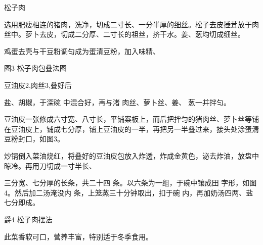\begin{recipe}{松子肉}

\ingredients


\cooking

\step 选用肥瘦相连的猪肉，洗净，切成二寸长、一分半厚的细丝。松子去皮捶茸放于肉丝中。萝卜去皮，切成二分厚、二寸长的祖丝，挤干水。姜、葱均切成细丝。

\step 鸡蛋去壳与干豆粉调匀成为蛋清豆粉，加入味精、

图3 松子肉包叠法图

\step 豆油皮2,肉丝3,叠好后

盐、胡椒，于深碗 中混合好，再与渚 肉丝、萝卜丝、姜、 葱一并拌匀。

\step 豆油皮一张修成六寸宽、八寸长，平铺案板上，而后把拌匀的猪肉丝、萝卜丝等铺在豆油皮上，铺成七分厚，铺上豆油皮的一半，再把另一半叠过来，接头处涂蛋淸豆粉封口，如图3。

\step 炒锅倒入菜油烧红，将叠好的豆油皮包放入炸透，炸成金黄色，泌去炸油，放盘中晾冷。再用刀切成一寸半长、

三分宽、七分厚的长条，共二十四 条。以六条为一组，于碗中镶成田 字形，如图4。然后加二汤淹没内 条，上笼蒸三十分钟取出，扣于碗 内，再加奶汤四两、盐七分即成。

爵4 松子肉摆法

\notes

此菜香软可口，营养丰富，特别适于冬季食用。

\end{recipe}

